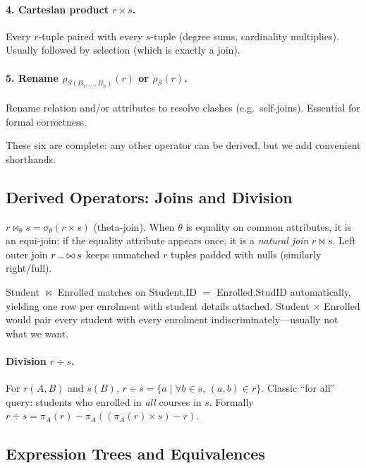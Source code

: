 \paragraph{4. Cartesian product $r\times s$.} Every $r$-tuple paired with every $s$-tuple (degree sums, cardinality multiplies). Usually followed by selection (which is exactly a join).

\paragraph{5. Rename $\rho_{S(B_1,\dots,B_n)}(r)$ or $\rho_{S}(r)$.} Rename relation and/or attributes to resolve clashes (e.g.\ self-joins). Essential for formal correctness.

These six are complete: any other operator can be derived, but we add convenient shorthands.

\subsection{Derived Operators: Joins and Division}

\begin{definition}[Joins]
$\displaystyle r\bowtie_\theta s = \sigma_\theta(r\times s)$ (theta-join). When $\theta$ is equality on common attributes, it is an equi-join; if the equality attribute appears once, it is a \emph{natural join} $r\bowtie s$. Left outer join $r\mathbin{\rule[0.15ex]{0.6em}{0.4pt}\bowtie} s$ keeps unmatched $r$ tuples padded with nulls (similarly right/full).
\end{definition}

\begin{example}
Student $\bowtie$ Enrolled matches on Student.ID $=$ Enrolled.StudID automatically, yielding one row per enrolment with student details attached. Student $\times$ Enrolled would pair every student with every enrolment indiscriminately---usually not what we want.
\end{example}

\paragraph{Division $r\div s$.} For $r(A,B)$ and $s(B)$, $r\div s = \{a\mid \forall b\in s,\,(a,b)\in r\}$. Classic ``for all'' query: students who enrolled in \emph{all} courses in $s$. Formally $r\div s = \pi_A(r)-\pi_A((\pi_A(r)\times s)-r)$.

\subsection{Expression Trees and Equivalences}


